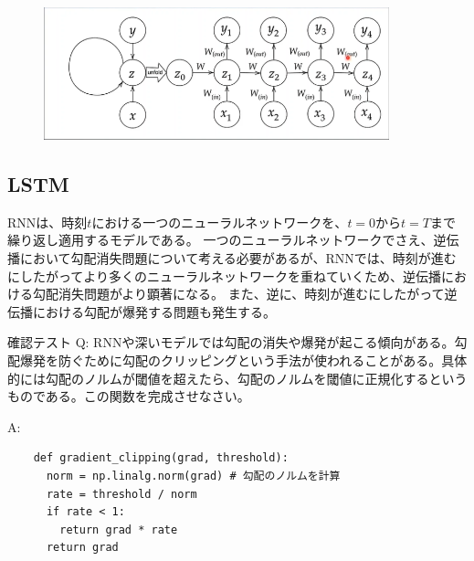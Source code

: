 \documentclass{ltjsarticle}
\begin{document}
\begin{figure}
  \centering
  \includegraphics[width=10cm]{./capture/confirm_test/day3_07_1.png}
  \caption{}
  \label{fig:day3_07_1}
\end{figure}

\subsection{LSTM}
RNNは、時刻$t$における一つのニューラルネットワークを、$t=0$から$t=T$まで繰り返し適用するモデルである。
一つのニューラルネットワークでさえ、逆伝播において勾配消失問題について考える必要があるが、RNNでは、時刻が進むにしたがってより多くのニューラルネットワークを重ねていくため、逆伝播における勾配消失問題がより顕著になる。
また、逆に、時刻が進むにしたがって逆伝播における勾配が爆発する問題も発生する。
\begin{itembox}[l]{確認テスト}
  Q: RNNや深いモデルでは勾配の消失や爆発が起こる傾向がある。勾配爆発を防ぐために勾配のクリッピングという手法が使われることがある。具体的には勾配のノルムが閾値を超えたら、勾配のノルムを閾値に正規化するというものである。この関数を完成させなさい。

  A: 
  \begin{verbatim}
    def gradient_clipping(grad, threshold):
      norm = np.linalg.norm(grad) # 勾配のノルムを計算
      rate = threshold / norm
      if rate < 1:
        return grad * rate 
      return grad
  \end{verbatim}  

\end{itembox}
\end{document}
